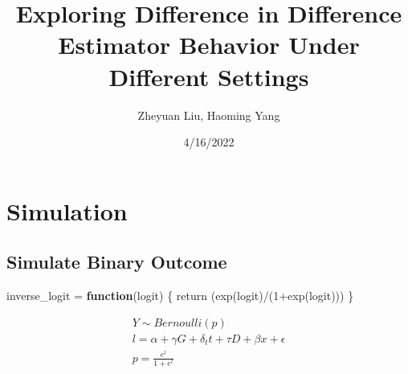\documentclass[
]{article}
\title{Exploring Difference in Difference Estimator Behavior Under
Different Settings}
\author{Zheyuan Liu, Haoming Yang}
\date{4/16/2022}
\newenvironment{Shaded}{\begin{snugshade}}{\end{snugshade}}
\newcommand{\ControlFlowTok}[1]{\textcolor[rgb]{0.13,0.29,0.53}{\textbf{#1}}}
\newcommand{\DecValTok}[1]{\textcolor[rgb]{0.00,0.00,0.81}{#1}}
\newcommand{\FunctionTok}[1]{\textcolor[rgb]{0.00,0.00,0.00}{#1}}
\newcommand{\NormalTok}[1]{#1}
\newcommand{\OtherTok}[1]{\textcolor[rgb]{0.56,0.35,0.01}{#1}}
\newcommand{\SpecialCharTok}[1]{\textcolor[rgb]{0.00,0.00,0.00}{#1}}
\begin{document}
\maketitle

\hypertarget{simulation}{%
\section{Simulation}\label{simulation}}

\hypertarget{simulate-binary-outcome}{%
\subsection{Simulate Binary Outcome}\label{simulate-binary-outcome}}

\begin{Shaded}
\begin{Highlighting}[]
\NormalTok{inverse\_logit }\OtherTok{=} \ControlFlowTok{function}\NormalTok{(logit) \{}
  \FunctionTok{return}\NormalTok{ (}\FunctionTok{exp}\NormalTok{(logit)}\SpecialCharTok{/}\NormalTok{(}\DecValTok{1}\SpecialCharTok{+}\FunctionTok{exp}\NormalTok{(logit)))}
\NormalTok{\}}
\end{Highlighting}
\end{Shaded}

\[
\begin{gather*}
Y \sim Bernoulli (p) \\
l = \alpha + \gamma G + \delta_t t + \tau D + \beta x + \epsilon \\
p = \frac{e^{l}}{1+e^{l}}
\end{gather*}
\]
\end{document}

